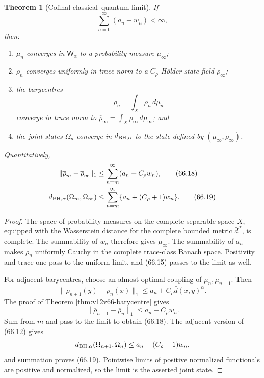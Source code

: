 \documentclass[11pt]{article}
\newtheorem{theorem}{Theorem}[section]
\theoremstyle{remark}
\begin{document}
\begin{theorem}[Cofinal classical--quantum limit]
\label{thm:v12v66-cofinal}
If
\begin{equation}
 \sum_{n=0}^\infty(a_n+w_n)<\infty,               \tag{66.17}
\end{equation}
then:
\begin{enumerate}
\item \(\mu_n\) converges in \({\mathsf W}_\alpha\) to a probability
measure \(\mu_\infty\);
\item \(\rho_n\) converges uniformly in trace norm to a
\(C_\rho\)-Hölder state field \(\rho_\infty\);
\item the barycentres
\[
 \overline\rho_n=\int_X\rho_n\,d\mu_n
\]
converge in trace norm to
\(\overline\rho_\infty=\int_X\rho_\infty\,d\mu_\infty\); and
\item the joint states \(\Omega_n\) converge in
\(d_{\rm BH,\alpha}\) to the state defined by
\((\mu_\infty,\rho_\infty)\).
\end{enumerate}
Quantitatively,
\begin{align}
 \|\overline\rho_m-\overline\rho_\infty\|_1
 &\leq
 \sum_{n=m}^\infty(a_n+C_\rho w_n),               \tag{66.18}\\
 d_{\rm BH,\alpha}(\Omega_m,\Omega_\infty)
 &\leq
 \sum_{n=m}^\infty
 \{a_n+(C_\rho+1)w_n\}.                           \tag{66.19}
\end{align}
\end{theorem}

\begin{proof}
The space of probability measures on the complete separable space
\(X\), equipped with the Wasserstein distance for the complete
bounded metric \(\bar d^\alpha\), is complete.  The summability of
\(w_n\) therefore gives \(\mu_\infty\).  The summability of \(a_n\)
makes \(\rho_n\) uniformly Cauchy in the complete trace-class Banach
space.  Positivity and trace one pass to the uniform limit, and
(66.15) passes to the limit as well.

For adjacent barycentres, choose an almost optimal coupling of
\(\mu_n,\mu_{n+1}\).  Then
\[
 \|\rho_{n+1}(y)-\rho_n(x)\|_1
 \leq a_n+C_\rho\bar d(x,y)^\alpha.
\]
The proof of Theorem \ref{thm:v12v66-barycentre} gives
\[
 \|\overline\rho_{n+1}-\overline\rho_n\|_1
 \leq a_n+C_\rho w_n.
\]
Sum from \(m\) and pass to the limit to obtain (66.18).
The adjacent version of (66.12) gives
\[
 d_{\rm BH,\alpha}(\Omega_{n+1},\Omega_n)
 \leq a_n+(C_\rho+1)w_n,
\]
and summation proves (66.19).  Pointwise limits of positive
normalized functionals are positive and normalized, so the limit is
the asserted joint state.
\end{proof}
\end{document}
